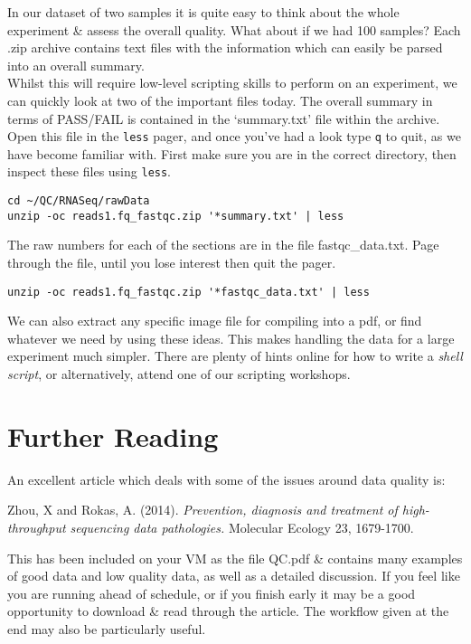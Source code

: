 \begin{advanced}
In our dataset of two samples it is quite easy to think about the whole experiment \& assess the overall quality.
What about if we had 100 samples?
Each .zip archive contains text files with the information which can easily be parsed into an overall summary. \\

Whilst this will require low-level scripting skills to perform on an experiment, we can quickly look at two of the important files today.
The overall summary in terms of PASS/FAIL is contained in the `summary.txt' file within the archive.
Open this file in the \texttt{less} pager, and once you've had a look type \texttt{q} to quit, as we have become familiar with.
First make sure you are in the correct directory, then inspect these files using \texttt{less}.
\begin{lstlisting}
cd ~/QC/RNASeq/rawData
unzip -oc reads1.fq_fastqc.zip '*summary.txt' | less
\end{lstlisting}

The raw numbers for each of the sections are in the file fastqc\_data.txt.
Page through the file, until you lose interest then quit the pager.
\begin{lstlisting}
unzip -oc reads1.fq_fastqc.zip '*fastqc_data.txt' | less
\end{lstlisting}

We can also extract any specific image file for compiling into a pdf, or find whatever we need by using these ideas.
This makes handling the data for a large experiment much simpler.
There are plenty of hints online for how to write a \textit{shell script}, or alternatively, attend one of our scripting workshops.
\end{advanced}

\section{Further Reading}
An excellent article which deals with some of the issues around data quality is:

Zhou, X and Rokas, A. (2014). \textit{Prevention, diagnosis and treatment of high-throughput sequencing data pathologies.} Molecular Ecology 23, 1679-1700.

This has been included on your VM as the file QC.pdf \& contains many examples of good data and low quality data, as well as a detailed discussion.
If you feel like you are running ahead of schedule, or if you finish early it may be a good opportunity to download \& read through the article.
The workflow given at the end may also be particularly useful.
